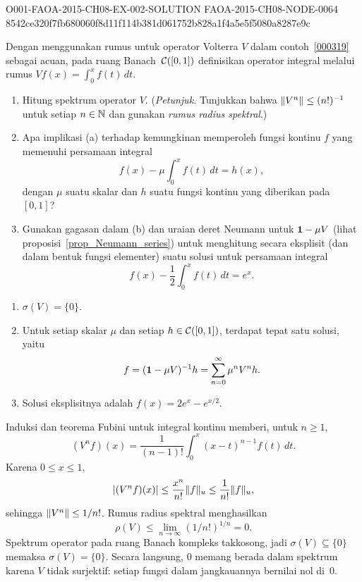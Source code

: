 \begin{o001solution}
  {O001-FAOA-2015-CH08-EX-002-SOLUTION}
  {FAOA-2015-CH08-NODE-0064}
  {8542ce320f7fb680060f8d11f114b381d061752b828a1f4a5e5f5080a8287e9c}
\begin{o001statement}
Dengan menggunakan rumus untuk operator Volterra $V$ dalam contoh~\ref{000319} sebagai
acuan, pada ruang Banach~$\mathcal{C}([0,1])$ definisikan operator integral melalui rumus $Vf(x)=\int_0^x f(t)\,dt$.
 \begin{enumerate}
  \item[(a)] Hitung spektrum operator $V$. (\emph{Petunjuk.} Tunjukkan bahwa $\lVert V^n\rVert
\le (n!)^{-1}$ untuk setiap $n \in \mathbb{N}$ dan gunakan \emph{rumus radius spektral}.)
  \item[(b)] Apa implikasi (a) terhadap kemungkinan memperoleh fungsi kontinu $f$ yang
memenuhi persamaan integral
   \[ f(x) - \mu\int_0^xf(t)\,dt = h(x), \]
dengan $\mu$ suatu skalar dan $h$ suatu fungsi kontinu yang diberikan pada~$[0,1]$?
  \item[(c)] Gunakan gagasan dalam (b) dan uraian deret Neumann untuk $\mathbf{1} - \mu V$ (lihat
proposisi~\ref{prop_Neumann_series}) untuk menghitung secara eksplisit (dan dalam bentuk fungsi elementer)
suatu solusi untuk persamaan integral
 \[f(x) - {\textstyle \frac12}\int_0^xf(t)\,dt = e^x.\]
 \end{enumerate}
\end{o001statement}
\begin{o001answer}
\begin{enumerate}
 \item[(a)] $\sigma(V)=\{0\}$.
 \item[(b)] Untuk setiap skalar $\mu$ dan setiap
 $h\in\mathcal{C}([0,1])$, terdapat tepat satu solusi, yaitu
 \[
   f=(\mathbf{1}-\mu V)^{-1}h=\sum_{n=0}^{\infty}\mu^nV^nh.
 \]
 \item[(c)] Solusi eksplisitnya adalah
 $f(x)=2e^x-e^{x/2}$.
\end{enumerate}
\end{o001answer}
\begin{o001proof}
Induksi dan teorema Fubini untuk integral kontinu memberi, untuk $n\ge1$,
\[
 (V^nf)(x)=\frac1{(n-1)!}\int_0^x(x-t)^{n-1}f(t)\,dt.
\]
Karena $0\le x\le1$,
\[
 |(V^nf)(x)|\le\frac{x^n}{n!}\lVert f\rVert_u
 \le\frac1{n!}\lVert f\rVert_u,
\]
sehingga $\lVert V^n\rVert\le1/n!$. Rumus radius spektral menghasilkan
\[
 \rho(V)\le\lim_{n\to\infty}(1/n!)^{1/n}=0.
\]
Spektrum operator pada ruang Banach kompleks takkosong, jadi
$\sigma(V)\subseteq\{0\}$ memaksa $\sigma(V)=\{0\}$. Secara langsung,
$0$ memang berada dalam spektrum karena $V$ tidak surjektif: setiap fungsi
dalam jangkauannya bernilai nol di~$0$.


\end{o001proof}
\end{o001solution}
